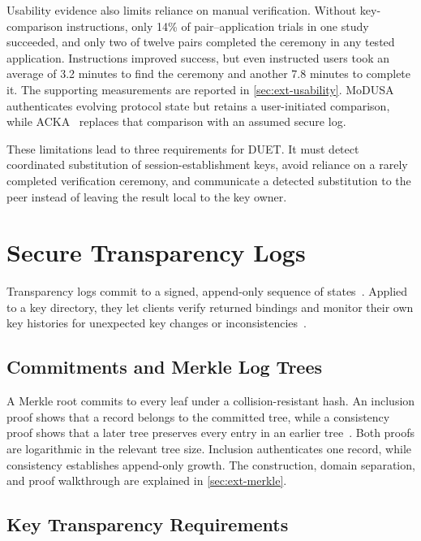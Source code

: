 Usability evidence also limits reliance on manual verification. Without key-comparison instructions,
only 14\% of pair--application trials in one study~\cite[Sections~5, 6.1, and~6.3]{vaziripour2017} succeeded, and only two of
twelve pairs completed the ceremony in any tested application. Instructions improved
success, but even instructed users took an average of 3.2 minutes to
find the ceremony and another 7.8 minutes to complete
it. The supporting measurements are reported in
\cref{sec:ext-usability}. MoDUSA~\cite{dowling2020nocompromise} authenticates evolving protocol state but retains a
user-initiated comparison, while ACKA~\cite{dowling2023acka} replaces that comparison with an assumed secure
log.

These limitations lead to three requirements for DUET. It must detect coordinated substitution of
session-establishment keys, avoid reliance on a rarely completed verification ceremony, and communicate
a detected substitution to the peer instead of leaving the result local to the key owner.

\section{Secure Transparency Logs}\label{sec:bg-logs}

Transparency logs commit to a signed, append-only sequence of
states~\cite{rfc9162}. Applied to a key directory, they let clients verify
returned bindings and monitor their own key histories for unexpected key changes or
inconsistencies~\cite{melara2015coniks,chase2019seemless}.

\subsection{Commitments and Merkle Log Trees}\label{ssec:bg-merkle}

A Merkle root commits to every leaf under a collision-resistant hash. An inclusion proof shows that a
record belongs to the committed tree, while a consistency proof shows that a later tree preserves
every entry in an earlier tree~\cite[Sections~2.1.1--2.1.4]{rfc9162}.
Both proofs are logarithmic in the relevant tree size. Inclusion authenticates one record, while
consistency establishes append-only growth. The construction, domain separation, and proof
walkthrough are explained in \cref{sec:ext-merkle}.

\subsection{Key Transparency Requirements}\label{ssec:bg-ct2kt}

